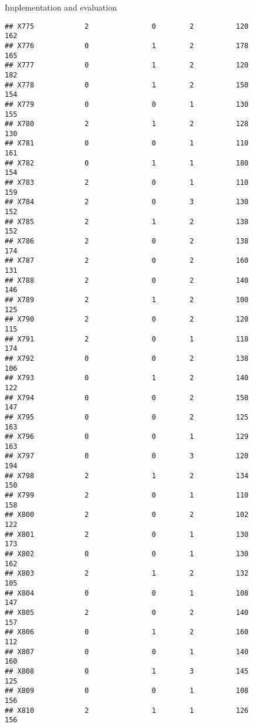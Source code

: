 \documentclass[
  ignorenonframetext,
]{beamer}
\begin{document}
\begin{frame}[fragile]{Implementation and evaluation}
\begin{verbatim}
## X775            2               0        2          120            162
## X776            0               1        2          178            165
## X777            0               1        2          120            182
## X778            0               1        2          150            154
## X779            0               0        1          130            155
## X780            2               1        2          128            130
## X781            0               0        1          110            161
## X782            0               1        1          180            154
## X783            2               0        1          110            159
## X784            2               0        3          130            152
## X785            2               1        2          138            152
## X786            2               0        2          138            174
## X787            2               0        2          160            131
## X788            2               0        2          140            146
## X789            2               1        2          100            125
## X790            2               0        2          120            115
## X791            2               0        1          118            174
## X792            0               0        2          138            106
## X793            0               1        2          140            122
## X794            0               0        2          150            147
## X795            0               0        2          125            163
## X796            0               0        1          129            163
## X797            0               0        3          120            194
## X798            2               1        2          134            150
## X799            2               0        1          110            158
## X800            2               0        2          102            122
## X801            2               0        1          130            173
## X802            0               0        1          130            162
## X803            2               1        2          132            105
## X804            0               0        1          108            147
## X805            2               0        2          140            157
## X806            0               1        2          160            112
## X807            0               0        1          140            160
## X808            0               1        3          145            125
## X809            0               0        1          108            156
## X810            2               1        1          126            156

\end{verbatim}
\end{frame}
\end{document}
